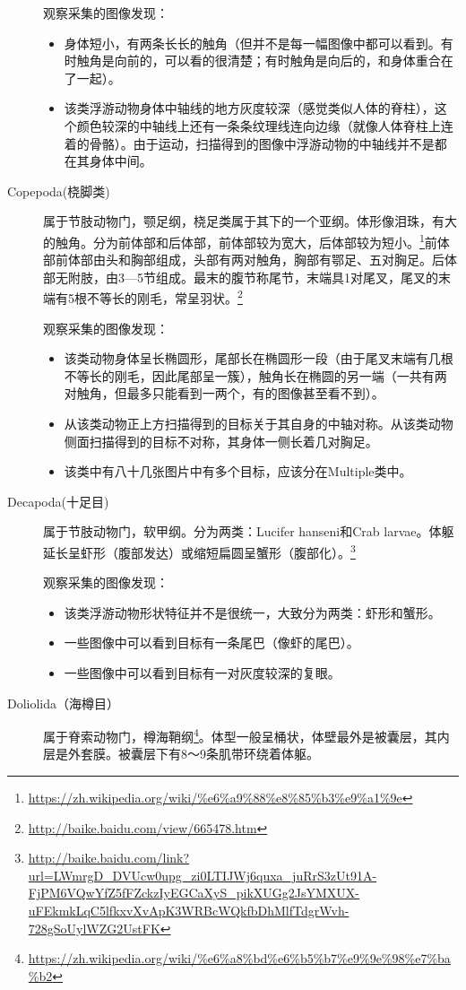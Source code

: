 \begin{description}
    观察采集的图像发现：
    \begin{itemize}
    \item 身体短小，有两条长长的触角（但并不是每一幅图像中都可以看到。有时触角是向前的，可以看的很清楚；有时触角是向后的，和身体重合在了一起）。
    \item 该类浮游动物身体中轴线的地方灰度较深（感觉类似人体的脊柱），这个颜色较深的中轴线上还有一条条纹理线连向边缘（就像人体脊柱上连着的骨骼）。由于运动，扫描得到的图像中浮游动物的中轴线并不是都在其身体中间。
    \end{itemize}
    \item[Copepoda(桡脚类)] 属于节肢动物门，颚足纲，桡足类属于其下的一个亚纲。体形像泪珠，有大的触角。分为前体部和后体部，前体部较为宽大，后体部较为短小。\footnote{\url{https://zh.wikipedia.org/wiki/\%e6\%a9\%88\%e8\%85\%b3\%e9\%a1\%9e}}前体部前体部由头和胸部组成，头部有两对触角，胸部有鄂足、五对胸足。后体部无附肢，由3—5节组成。最末的腹节称尾节，末端具1对尾叉，尾叉的末端有5根不等长的刚毛，常呈羽状。\footnote{\url{http://baike.baidu.com/view/665478.htm}}
    
    观察采集的图像发现：
    \begin{itemize}
    \item 该类动物身体呈长椭圆形，尾部长在椭圆形一段（由于尾叉末端有几根不等长的刚毛，因此尾部呈一簇），触角长在椭圆的另一端（一共有两对触角，但最多只能看到一两个，有的图像甚至看不到）。
    \item 从该类动物正上方扫描得到的目标关于其自身的中轴对称。从该类动物侧面扫描得到的目标不对称，其身体一侧长着几对胸足。
    \item {\color{blue}该类中有八十几张图片中有多个目标，应该分在Multiple类中。}
    \end{itemize}
    
    \item[{\color{blue}Decapoda(十足目)}] 属于节肢动物门，软甲纲。分为两类：Lucifer hanseni和Crab larvae。体躯延长呈虾形（腹部发达）或缩短扁圆呈蟹形（腹部化）。\footnote{\url{http://baike.baidu.com/link?url=LWmrgD_DVUcw0upg_zi0LTIJWj6quxa_juRrS3zUt91A-FjPM6VQwYfZ5fFZckzIyEGCaXyS_pikXUGg2JsYMXUX-uFEkmkLqC5lfkxvXvApK3WRBcWQkfbDhMlfTdgrWvh-728gSoUylWZG2UstFK}}
    
    观察采集的图像发现：
    \begin{itemize}
    \item 该类浮游动物形状特征并不是很统一，大致分为两类：虾形和蟹形。
    \item 一些图像中可以看到目标有一条尾巴（像虾的尾巴）。
    \item 一些图像中可以看到目标有一对灰度较深的复眼。
    \end{itemize}
    \item[Doliolida（海樽目）] 属于脊索动物门，樽海鞘纲\footnote{\url{https://zh.wikipedia.org/wiki/\%e6\%a8\%bd\%e6\%b5\%b7\%e9\%9e\%98\%e7\%ba\%b2}}。体型一般呈桶状，体壁最外是被囊层，其内层是外套膜。被囊层下有8～9条肌带环绕着体躯。
    

\end{description}
